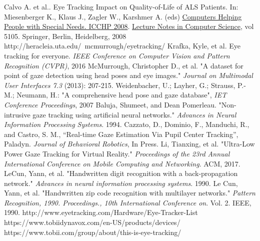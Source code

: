\documentclass[10pt,twocolumn,letterpaper]{article}
\begin{document}
{\small


\begin{thebibliography}{1}
  Calvo A. et al.. Eye Tracking Impact on Quality-of-Life of ALS
  Patients. In: Miesenberger K., Klaus J., Zagler W., Karshmer
  A. (eds) \underline{Computers Helping People with Special Needs. ICCHP
    2008}. \underline{Lecture Notes in Computer Science}, vol 5105. Springer,
  Berlin, Heidelberg, 2008
  http://heracleia.uta.edu/~mcmurrough/eyetracking/
  Krafka, Kyle, et al. Eye tracking for everyone.
  \textit{IEEE Conference on Computer Vision and Pattern Recognition
    (CVPR)}, 2016
  McMurrough, Christopher D., et al. "A dataset for point of gaze
  detection using head poses and eye images."
  \textit{Journal on Multimodal User Interfaces 7.3} (2013): 207-215.
  Weidenbacher, U.; Layher, G.; Strauss, P.-M.; Neumann, H.: "A
  comprehensive head pose and gaze database",
  \textit{IET Conference Proceedings}, 2007
  Baluja, Shumeet, and Dean Pomerleau. "Non-intrusive gaze tracking
  using artificial neural networks." \textit{Advances in Neural
    Information Processing Systems}. 1994.
  Cazzato, D., Dominio, F., Manduchi, R., and Castro, S. M.,
  “Real-time Gaze Estimation Via Pupil Center Tracking”,
  Paladyn. \textit{Journal of Behavioral Robotics}, In Press.
  Li, Tianxing, et al. "Ultra-Low Power Gaze Tracking for Virtual
  Reality." \textit{Proceedings of the 23rd Annual International
    Conference on Mobile Computing and Networking}. ACM, 2017.
  LeCun, Yann, et al. "Handwritten digit recognition with a
  back-propagation network." \textit{Advances in neural information
    processing systems}. 1990.
  Le Cun, Yann, et al. "Handwritten zip code recognition with
  multilayer networks." \textit{Pattern Recognition,
    1990. Proceedings., 10th International Conference
    on}. Vol. 2. IEEE, 1990.
  http://www.eyetracking.com/Hardware/Eye-Tracker-List
  https://www.tobiidynavox.com/en-US/products/devices/
  https://www.tobii.com/group/about/this-is-eye-tracking/

\end{thebibliography}
}
\end{document}

